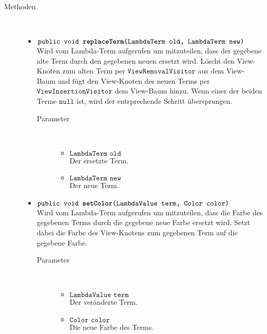 \begin{description}
\item[Methoden] \hfill \\
	\vspace{-.8cm}
	\begin{itemize}
		\item $\texttt{public void \textbf{replaceTerm}(LambdaTerm old, LambdaTerm new)}$ \\ Wird vom Lambda-Term aufgerufen um mitzuteilen, dass der gegebene alte Term durch den gegebenen neuen ersetzt wird. Löscht den View-Knoten zum alten Term per $\texttt{ViewRemovalVisitor}$ aus dem View-Baum und fügt den View-Knoten des neuen Terms per $\texttt{ViewInsertionVisitor}$ dem View-Baum hinzu. Wenn einer der beiden Terme $\texttt{null}$ ist, wird der entsprechende Schritt übersprungen.
		\begin{description}
			\item[Parameter] \hfill \\
			\vspace{-.8cm}
			\begin{itemize}
				\item $\texttt{LambdaTerm old}$ \\ Der ersetzte Term.
				\item $\texttt{LambdaTerm new}$ \\ Der neue Term.
			\end{itemize}
		\end{description}
		
		\item $\texttt{public void \textbf{setColor}(LambdaValue term, Color color)}$ \\ Wird vom Lambda-Term aufgerufen um mitzuteilen, dass die Farbe des gegebenen Terms durch die gegebene neue Farbe ersetzt wird. Setzt dabei die Farbe des View-Knotens zum gegebenen Term auf die gegebene Farbe.
		\begin{description}
			\item[Parameter] \hfill \\
			\vspace{-.8cm}
			\begin{itemize}
				\item $\texttt{LambdaValue term}$ \\ Der veränderte Term.
				\item $\texttt{Color color}$ \\ Die neue Farbe des Terms.
			\end{itemize}
		\end{description}
		

\end{itemize}
\end{description}
